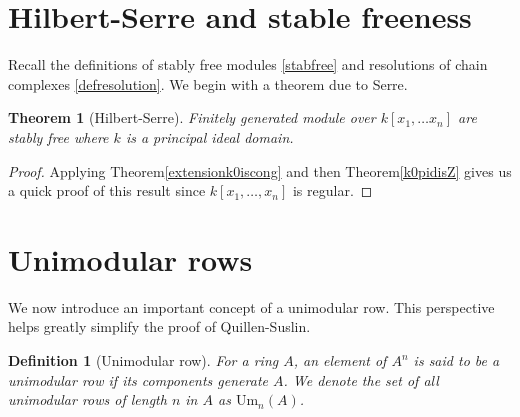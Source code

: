 \documentclass[12pt]{report}
\numberwithin{equation}{section}
\newcounter{dummy} \numberwithin{dummy}{section}
\newtheorem{theorem}[dummy]{Theorem}
\newtheorem{definition}[dummy]{Definition}
\begin{document}
	\section{Hilbert-Serre and stable freeness}
%
%		
%		
%	
	Recall the definitions of stably free modules \ref{stabfree} and resolutions of chain complexes \ref{defresolution}. We begin with a theorem due to Serre.
	\begin{theorem}[Hilbert-Serre]
	Finitely generated module over $k[x_1,\dots x_n]$ are stably free where $k$ is a principal ideal domain.
	\end{theorem}
	\begin{proof}
		Applying Theorem\ref{extensionk0iscong} and then Theorem\ref{k0pidisZ} gives us a quick proof of this result since $k[x_1,\dots,x_n]$ is regular. 
		
%		
	\end{proof}
	
	\section{Unimodular rows}
	We now introduce an important concept of a unimodular row. This perspective helps greatly simplify the proof of Quillen-Suslin.
	
	\begin{definition}[Unimodular row]
		For a ring $A$, an element of $A^n$ is said to be a unimodular row if its components generate $A$. We denote the set of all unimodular rows of length $n$ in $A$ as $\mathrm{Um}_n(A)$.
	\end{definition}
	
\end{document}
